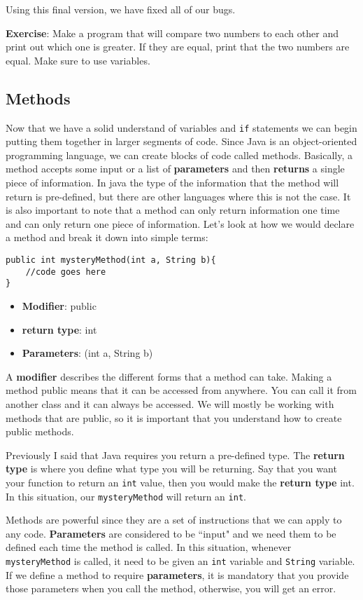 \documentclass[11pt,fleqn]{article}
\begin{document}
Using this final version, we have fixed all of our bugs.

\textbf{Exercise}: Make a program that will compare two numbers to each other
and print out which one is greater. If they are equal, print that the two
numbers are equal. Make sure to use variables. 

\begin{center}
\section*{Methods}
\end{center}

Now that we have a solid understand of variables and \texttt{if} statements we can
begin putting them together in larger segments of code. Since Java is an
object-oriented programming language, we can create blocks of code called
methods. Basically, a method accepts some input or a list of \textbf{parameters}
and then \textbf{returns} a single piece of information. In java the type of the
information that the method will return is pre-defined, but there are other
languages where this is not the case. It is also important to note that a method
can only return information one time and can only return one piece of
information. Let's look at how we would declare a method and break it down into
simple terms:

\begin{verbatim}
public int mysteryMethod(int a, String b){
    //code goes here
}
\end{verbatim}

\begin{itemize}
    \item
        \textbf{Modifier}: public

    \item
        \textbf{return type}: int

    \item
        \textbf{Parameters}: (int a, String b)
\end{itemize}

A \textbf{modifier} describes the different forms that a method can take. Making a method
public means that it can be accessed from anywhere. You can call it from another
class and it can always be accessed. We will mostly be working with methods that
are public, so it is important that you understand how to create public methods.

Previously I said that Java requires you return a pre-defined type. The
\textbf{return type} is where you define what type you will be returning. Say
that you want your function to return an \texttt{int} value, then you would make
the \textbf{return type} int. In this situation, our \texttt{mysteryMethod} will
return an \texttt{int}. 

Methods are powerful since they are a set of instructions that we can apply to
any code. \textbf{Parameters} are considered to be ``input" and we need them to
be defined each time the method is called. In this situation, whenever
\texttt{mysteryMethod} is called, it need to be given an \texttt{int} variable
and \texttt{String} variable. If we define a method to require
\textbf{parameters}, it is mandatory that you provide those parameters when you
call the method, otherwise, you will get an error. 
\end{document}
